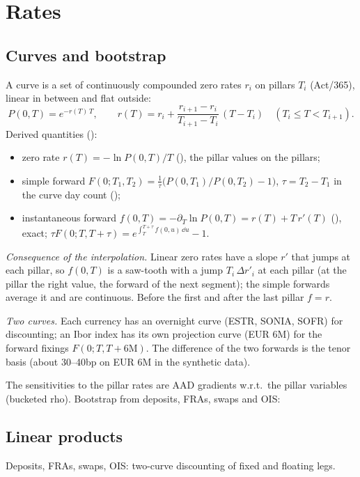 \section{Rates}\label{sec:mp-rates}

\subsection{Curves and bootstrap}\label{sec:mp-curves}
A curve is a set of continuously compounded zero rates $r_i$ on pillars $T_i$ (Act/365), linear in between and
flat outside:
\[
  P(0,T) = e^{-r(T)\,T}, \qquad
  r(T) = r_i + \frac{r_{i+1} - r_i}{T_{i+1} - T_i}\,(T - T_i) \quad (T_i \le T < T_{i+1}).
\]
Derived quantities ():
\begin{itemize}[nosep]
  \item zero rate $r(T) = -\ln P(0,T)/T$ (), the pillar values on the pillars;
  \item simple forward $F(0;T_1,T_2) = \frac{1}{\tau}\big(P(0,T_1)/P(0,T_2) - 1\big)$, $\tau = T_2 - T_1$ in the curve
        day count ();
  \item instantaneous forward $f(0,T) = -\partial_T \ln P(0,T) = r(T) + T\,r'(T)$ (), exact;
        $\tau F(0;T,T+\tau) = e^{\int_T^{T+\tau} f(0,u)\,\dd u} - 1$.
\end{itemize}
\emph{Consequence of the interpolation.} Linear zero rates have a slope $r'$ that jumps at each pillar, so $f(0,T)$
is a saw-tooth with a jump $T_i\,\Delta r'_i$ at each pillar (at the pillar the right value, the forward of the next
segment); the simple forwards average it and are continuous. Before the first and after the last pillar $f = r$.

\emph{Two curves.} Each currency has an overnight curve (ESTR, SONIA, SOFR) for discounting; an Ibor index has its
own projection curve (EUR 6M) for the forward fixings $F(0;T,T+6\mathrm{M})$. The difference of the two forwards
is the tenor basis (about 30--40bp on EUR 6M in the synthetic data).

The sensitivities to the pillar rates are AAD gradients w.r.t.\ the pillar variables (bucketed rho).
Bootstrap from deposits, FRAs, swaps and OIS: \pending
{}

\subsection{Linear products}\label{sec:mp-linear}
Deposits, FRAs, swaps, OIS: two-curve discounting of fixed and floating legs.


